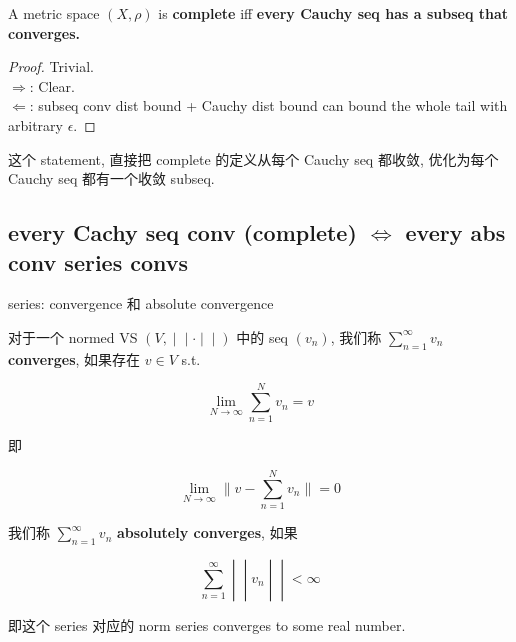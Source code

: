 \documentclass{qlnotes-export}
\begin{document}
\begin{lemma}\label{lem-09-l-p-space-and-inequalities-lemma-001}

A metric space \((X,\rho)\) is \textbf{complete} iff \textbf{every Cauchy seq has a subseq that converges.}

\end{lemma}

\begin{proof}

Trivial.\\
\(\Longrightarrow\): Clear.\\
\(\Longleftarrow\): subseq conv dist bound + Cauchy dist bound can bound the whole tail with arbitrary \(\epsilon\).

\end{proof}

这个 statement, 直接把 complete 的定义从每个 Cauchy seq 都收敛, 优化为每个 Cauchy seq 都有一个收敛 subseq.

\subsection{\texorpdfstring{every Cachy seq conv (complete) \(\Leftrightarrow\) every abs conv series convs}{every Cachy seq conv (complete) \textbackslash Leftrightarrow every abs conv series convs}}\label{every-cachy-seq-conv-complete-leftrightarrow-every-abs-conv-series-convs}

\begin{definition}{series: convergence 和 absolute convergence}\label{def-09-l-p-space-and-inequalities-series-convergence-absolute-convergence}

对于一个 normed VS \(\left. (V, \middle| \middle| \cdot \middle| \middle| ) \right.\) 中的 seq \((v_{n})\), 我们称 \(\sum_{n = 1}^{\infty}v_{n}\) \textbf{converges}, 如果存在 \(v \in V\) s.t.

\[\lim\limits_{N\rightarrow\infty}\sum\limits_{n = 1}^{N}v_{n} = v\]

即

\[\lim\limits_{N\rightarrow\infty} \parallel v - \sum\limits_{n = 1}^{N}v_{n} \parallel = 0\]

我们称 \(\sum_{n = 1}^{\infty}v_{n}\) \textbf{absolutely converges}, 如果

\[\left. \sum\limits_{n = 1}^{\infty} \middle| \middle| v_{n} \middle| \middle| < \infty \right.\]

即这个 series 对应的 norm series converges to some real number.

\end{definition}
\end{document}
